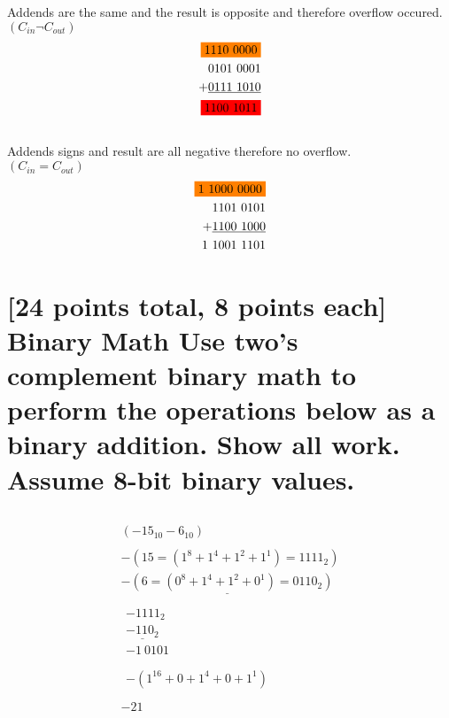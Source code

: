 \documentclass[12pt]{article}
\begin{document}
\subsection{}
Addends are the same and the result is opposite and therefore overflow occured. \\
$(C_{in} \neg C_{out})$
\begin{equation}
	\begin{split}
		\colorbox{orange}{1110\ 0000} \\
		0101\ 0001 \\ + \underline{0111\ 1010}\\
		\colorbox{red}{1100\ 1011}
	\end{split}
\end{equation}

\subsection{}
Addends signs and result are all negative therefore no overflow.\\
$(C_{in} = C_{out})$
\begin{equation}
	\begin{split}
		\colorbox{orange}{1\ 1000\ 0000}\\
		1101\ 0101 \\ + \underline{1100\ 1000}\\
		1\ 1001\ 1101 
	\end{split}
\end{equation}

\section{
	[24 points total, 8 points each] Binary Math
Use two's complement binary math to perform the operations below as a binary addition.
Show all work. Assume 8-bit binary values.
}
\subsection{}
\begin{gather*}
(-15_{10} -6_{10}) \\ \\
-(15 = (1^8 + 1^4 + 1^2 + 1^1) = 1111_2) \\
\underline{-(6 = (0^8 + 1^4 + 1^2 + 0^1) = 0110_2)}\\ \\
\begin{split}
-1111_2\\ \underline{-110_2}\\
-1\ 0101
\end{split} \\ \\
\begin{split}
-(1^{16} + 0 + 1^{4} + 0 + 1^{1})
\end{split} \\ \\
-21
\end{gather*}
\end{document}
